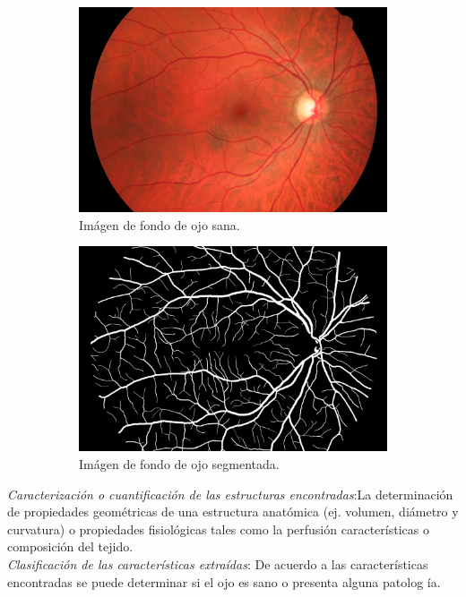 \begin{figure}[H]
    \centering
    \begin{subfigure}[b]{0.3\textwidth}
				\centering
        \includegraphics[width=\textwidth]{./Figures/01_h}
        \caption{Im\'agen de fondo de ojo sana.}
        \label{sanaHrf}
    \end{subfigure}
    \begin{subfigure}[b]{0.3\textwidth}
				\centering
        \includegraphics[width=\textwidth]{./Figures/01_h_seg}
        \caption{Im\'agen de fondo de ojo segmentada.}
        \label{segmentadaHrf}
    \end{subfigure}
    \caption{}
    \label{HRFSana_Segmentada}
\end{figure}

\textit{Caracterizaci\'on o  cuantificaci\'on de las estructuras encontradas}:La determinaci\'on de propiedades geom\'etricas de una estructura anat\'omica (ej. volumen, di\'ametro y curvatura) o propiedades fisiol\'ogicas tales como la perfusi\'on caracter\'isticas o composici\'on del tejido.\\
\textit{Clasificaci\'on de las caracter\'isticas extra\'idas}: De acuerdo a las caracter\'isticas encontradas se puede determinar si el ojo es sano o presenta alguna patolog \'ia.  \\


